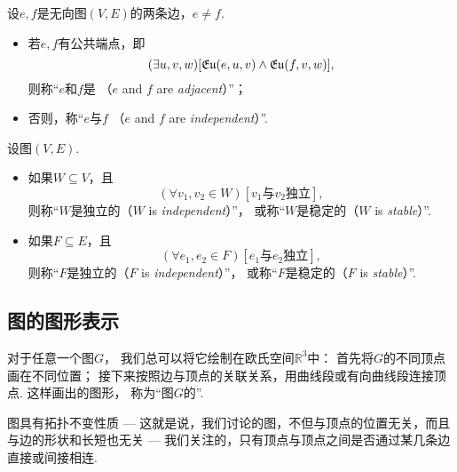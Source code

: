 \begin{definition}
设\(e,f\)是无向图\((V,E)\)的两条边，\(e \neq f\).
\begin{itemize}
	\item 若\(e,f\)有公共端点，即\begin{equation*}
		(\exists u,v,w)
		[
			\mathfrak{Eu}(e,u,v)
			\land
			\mathfrak{Eu}(f,v,w)
		],
	\end{equation*}
	则称“\(e\)和\(f\)是%
	（\(e\) and \(f\) are \emph{adjacent}）”；

	\item 否则，称“\(e\)与\(f\) %
	（\(e\) and \(f\) are \emph{independent}）”.
\end{itemize}
\end{definition}

\begin{definition}
设图\((V,E)\).
\begin{itemize}
	\item 如果\(W \subseteq V\)，且\begin{equation*}
		(\forall v_1,v_2 \in W)
		\left[\text{$v_1$与$v_2$独立}\right],
	\end{equation*}
	则称“\(W\)是独立的（\(W\) is \emph{independent}）”，
	或称“\(W\)是稳定的（\(W\) is \emph{stable}）”.

	\item 如果\(F \subseteq E\)，且\begin{equation*}
		(\forall e_1,e_2 \in F)
		\left[\text{$e_1$与$e_2$独立}\right],
	\end{equation*}
	则称“\(F\)是独立的（\(F\) is \emph{independent}）”，
	或称“\(F\)是稳定的（\(F\) is \emph{stable}）”.
\end{itemize}
\end{definition}

\subsection{图的图形表示}
对于任意一个图\(G\)，
我们总可以将它绘制在欧氏空间\(\mathbb{R}^3\)中：
首先将\(G\)的不同顶点画在不同位置；
接下来按照边与顶点的关联关系，用曲线段或有向曲线段连接顶点.
这样画出的图形，
称为“图\(G\)的”.
\begin{remark}
图具有拓扑不变性质 ---
这就是说，我们讨论的图，不但与顶点的位置无关，而且与边的形状和长短也无关
--- 我们关注的，只有顶点与顶点之间是否通过某几条边直接或间接相连.
\end{remark}

